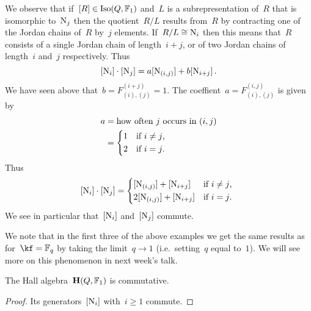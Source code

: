 \documentclass[a4paper, 11pt, twoside=semi]{scrartcl}
\begin{document}
\begin{example}
\begin{enumerate}
      We observe that if~$[R] \in \operatorname{Iso}(Q, \mathbb{F}_1)$ and~$L$ is a subrepresentation of~$R$ that is isomorphic to~$\mathrm{N}_j$ then the quotient~$R/L$ results from~$R$ by contracting one of the Jordan chains of~$R$ by~$j$ elements.
      If~$R/L \cong \mathrm{N}_i$ then this means that~$R$ consists of a single Jordan chain of length~$i+j$, or of two Jordan chains of length~$i$ and~$j$ respectively.
      Thus
      \[
        [\mathrm{N}_i] \cdot [\mathrm{N}_j]
        =
        a [ \mathrm{N}_{(i,j)} ]
        +
        b [ \mathrm{N}_{i+j} ] \,.
      \]
      We have seen above that~$b = F^{(i+j)}_{(i),(j)} = 1$.
      The coeffient~$a = F^{(i,j)}_{(i),(j)}$ is given by
      \begin{align*}
        a
        &=
        \text{how often~$j$ occurs in~$(i,j)$}
        \\
        &=
        \begin{cases*}
          1
          &
          if~$i \neq j$,
          \\
          2
          &
          if~$i = j$.
        \end{cases*}
      \end{align*}
      Thus
      \begin{equation}
        \label{computing product of two generators for representations}
        \class{\Nil_i} \cdot \class{\Nil_j}
        =
        \begin{cases*}
          \class{\Nil_{(i,j)}} + \class{\Nil_{i+j}}
          &
          if~$i \neq j$,
          \\
          2 \class{\Nil_{(i,j)}} + \class{\Nil_{i+j}}
          &
          if~$i = j$.
        \end{cases*}
      \end{equation}
      We see in particular that~$[\mathrm{N}_i]$ and~$[\mathrm{N}_j]$ commute.
  \end{enumerate}
  We note that in the first three of the above examples we get the same results as for~$\kf = \Finite_q$ by taking the limit~$q \to 1$ (i.e.\ setting~$q$ equal to~$1$).
  We will see more on this phenomenon in next week’s talk.
\end{example}

\begin{corollary}
  The Hall algebra~$\mathbf{H}(Q, \mathbb{F}_1)$ is commutative.
\end{corollary}

\begin{proof}
  Its generators~$[\mathrm{N}_i]$ with~$i \geq 1$ commute.
\end{proof}
\end{document}
